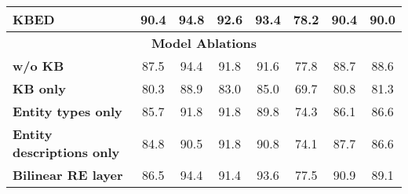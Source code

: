 \documentclass[11pt]{article}
\begin{document}
\begin{table*}[h]
{\begin{tabular}{@{}lccccccc@{}}
\midrule
\textbf{KBED}                                          & 90.4           & {\textbf{94.8}} & {\textbf{92.6}} & {\textbf{93.4}} & {78.2}    & \multicolumn{1}{c|}{{\textbf{90.4}}} & \textbf{90.0} \\ \midrule
\multicolumn{8}{c}{\textbf{Model Ablations}}                                                                                                                                                                          \\ \midrule
\textbf{w/o KB}            & 87.5              & 94.4                   & 91.8                   & 91.6                   & 77.8             & \multicolumn{1}{c|}{88.7}                   & 88.6             \\
\textbf{KB only}                                       & 80.3              & 88.9                   & 83.0                   & 85.0                   & 69.7             & \multicolumn{1}{c|}{80.8}                   & 81.3             \\
\textbf{Entity types only}                      & 85.7              & 91.8                   & 91.8                   & 89.8                   & 74.3             & \multicolumn{1}{c|}{86.1}                   & 86.6             \\

\textbf{Entity descriptions only}                             & 84.8              & 90.5                  & 91.8                   & 90.8                   & 74.1             & \multicolumn{1}{c|}{87.7}                   & 86.6             \\ 

\textbf{Bilinear RE layer} & 86.5 & 94.4 & 91.4 & 93.6 & 77.5 & \multicolumn{1}{c|}{90.9} &  89.1 \\

\bottomrule
\end{tabular}
}
\caption{Entity disambiguation InKB micro F1 scores on test sets. The best value (excl. model ablations) is \textbf{bold} and second best is {\ul underlined}. We produced results using the code released by the authors. Indicates the model was trained on both AIDA and Wikipedia hyperlinks.}
\label{tab:standard-ed}
\end{table*}
\end{document}
